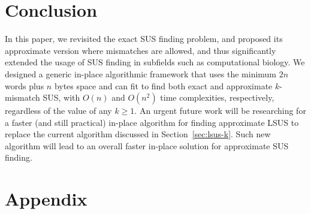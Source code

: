 \documentclass[11pt]{llncs}
\begin{document}
\section{Conclusion}
In this paper, we revisited the exact SUS finding problem, and
proposed its approximate version where mismatches are allowed, and
thus significantly extended the usage of SUS finding in subfields such
as computational biology. We designed a generic in-place algorithmic
framework that uses the minimum $2n$ words plus $n$ bytes space and
can fit to find both exact and approximate $k$-mismatch SUS, with
$O(n)$ and $O(n^2)$ time complexities, respectively, regardless of the
value of any $k\geq 1$. 
An urgent future work will be researching for a faster (and still
practical) in-place algorithm for finding approximate LSUS to replace
the current algorithm discussed in Section~\ref{sec:lsus-k}.  Such new
algorithm will lead to an overall faster in-place solution for
approximate SUS finding.



\small





\newpage

\appendix

\section*{Appendix}
\end{document}
